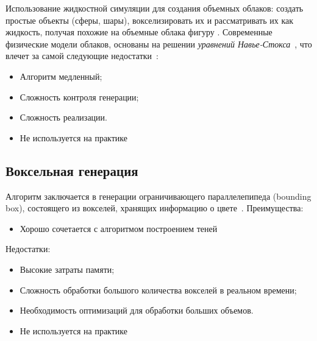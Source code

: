 Использование жидкостной симуляции для создания объемных облаков: создать простые объекты (сферы, шары), вокселизировать их и рассматривать их как жидкость, получая похожие на объемные облака фигуру \cite{guerrilla_volumetric_cloudscapes_2023}.
Современные физические модели облаков, основаны на решении \textit{уравнений Навье-Стокса}~\cite{sym10040125}, что влечет за самой следующие недостатки~\cite{sym10040125}:\\
\begin{itemize}
	\item Алгоритм медленный;
	\item Сложность контроля генерации;
	\item Сложность реализации.
	\item Не используется на практике~\cite{unigine_volumetric_clouds_2022}
\end{itemize}
\subsection{Воксельная генерация}
Алгоритм заключается в генерации ограничивающего параллелепипеда (bounding box), состоящего из вокселей, хранящих информацию о цвете~\cite{guerrilla_volumetric_cloudscapes_2023}.
Преимущества:
\begin{itemize} 
	\item Хорошо сочетается с алгоритмом построением теней
\end{itemize}
Недостатки: 
\begin{itemize} 
	\item Высокие затраты памяти; 
	\item Сложность обработки большого количества вокселей в реальном времени; 
	\item Необходимость оптимизаций для обработки больших объемов. 
	\item Не используется на практике~\cite{guerrilla_volumetric_cloudscapes_2023}
\end{itemize}
